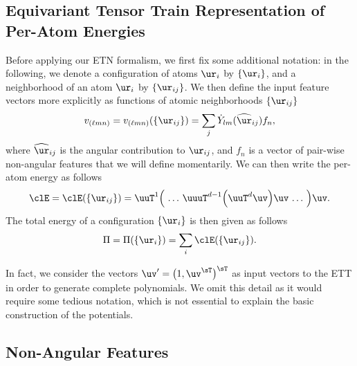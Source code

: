 \subsection{Equivariant Tensor Train Representation of Per-Atom Energies}

Before applying our ETN formalism, we first fix some additional notation: in the following, we denote a configuration of atoms $\ur_{i}$ by $\{ \ur_{i} \}$, and a neighborhood of an atom $\ur_{i}$ by $\{ \ur_{ij} \}$.
We then define the input feature vectors more explicitly as functions of atomic neighborhoods $\{ \ur_{ij} \}$
\begin{equation}
    v_{(\ell mn)} = v_{(\ell mn)}(\{ \ur_{ij} \}) = \sum_j \dot Y_{lm}(\widehat\ur_{ij}) f_n,
\end{equation}
where $\widehat\ur_{ij}$ is the angular contribution to $\ur_{ij}$, and $f_n$ is a vector of pair-wise non-angular features that we will define momentarily.
We can then write the per-atom energy as follows
\begin{equation}
    \clE = \clE(\{ \ur_{ij} \}) =
    \uuT^1 \Big( \,\ldots\, \uuuT^{d-1} \Big( \uuT^d \uv \Big) \uv \,\ldots\, \Big) \uv.
\end{equation}
The total energy of a configuration $\{ \ur_i \}$ is then given as follows
\begin{equation}
 \Pi = \Pi(\{ \ur_i \}) = \sum_i \clE(\{ \ur_{ij} \}).
\end{equation}

\begin{remark}
    In fact, we consider the vectors $\uv' = \big( 1, \uv^\sT \big)^\sT$ as input vectors to the ETT in order to generate complete polynomials.
    We omit this detail as it would require some tedious notation, which is not essential to explain the basic construction of the potentials.
\end{remark}

\subsection{Non-Angular Features}

